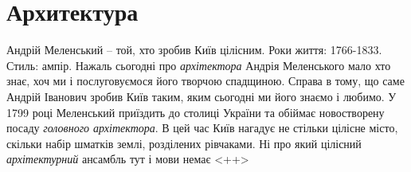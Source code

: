  
 
 
 
 
\chapter{Архитектура}

Андрій Меленський – той, хто зробив Київ цілісним.  Роки життя: 1766-1833.
Стиль: ампір.
Нажаль сьогодні про \emph{архітектора} Андрія Меленського мало хто знає, хоч ми і
послуговуємося його творчою спадщиною. Справа в тому, що саме Андрій Іванович
зробив Київ таким, яким сьогодні ми його знаємо і любимо.
У 1799 році Меленський приїздить до столиці України та обіймає новостворену
посаду \emph{головного архітектора}. В цей час Київ нагадує не стільки цілісне місто,
скільки набір шматків землі, розділених рівчаками. Ні про який цілісний
\emph{архітектурний} ансамбль тут і мови немає
  <++>
